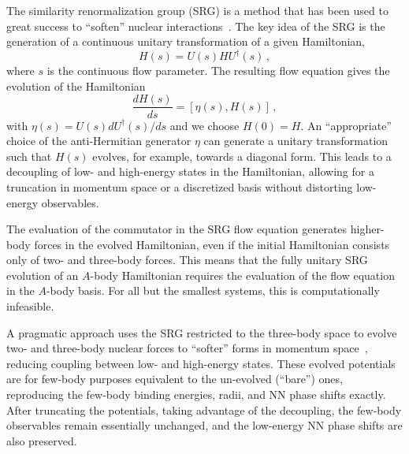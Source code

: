 The similarity renormalization group (SRG) is a method that has been used to great success to ``soften'' nuclear interactions~\cite{Bogn06srg,Wegn94srg,Glaz93srg}.
The key idea of the SRG is the generation of a continuous unitary transformation of a given Hamiltonian,
\begin{equation}
  H(s) = U(s) H U^{\dagger}(s)\,,
\end{equation}
where $s$ is the continuous flow parameter.
The resulting flow equation gives the evolution of the Hamiltonian
\begin{equation}\label{eq:srg_flow_eq}
  \frac{d H(s)}{ds} = [\eta(s), H(s)]\,,
\end{equation}
with $\eta(s) = U(s) d U^{\dagger}(s)/ ds$ and we choose $H(0) = H$.
An ``appropriate'' choice of the anti-Hermitian generator $\eta$
can generate a unitary transformation
such that $H(s)$ evolves, for example, towards a diagonal form.
This leads to a decoupling of low- and high-energy states in the Hamiltonian,
allowing for a truncation in momentum space or a discretized basis
without distorting low-energy observables.

The evaluation of the commutator in the SRG flow equation generates higher-body forces in the evolved Hamiltonian,
even if the initial Hamiltonian consists only of two- and three-body forces.
This means that the fully unitary SRG evolution of an $A$-body Hamiltonian
requires the evaluation of the flow equation in the $A$-body basis.
For all but the smallest systems, this is computationally infeasible.

A pragmatic approach uses the SRG restricted to the three-body space
to evolve two- and three-body nuclear forces to ``softer'' forms in momentum space~\cite{Hebe12srg3n},
reducing coupling between low- and high-energy states.
These evolved potentials are for few-body purposes equivalent to the un-evolved (``bare'') ones,
reproducing the few-body binding energies, radii, and NN phase shifts exactly.
After truncating the potentials, taking advantage of the decoupling,
the few-body observables remain essentially unchanged,
and the low-energy NN phase shifts are also preserved.


